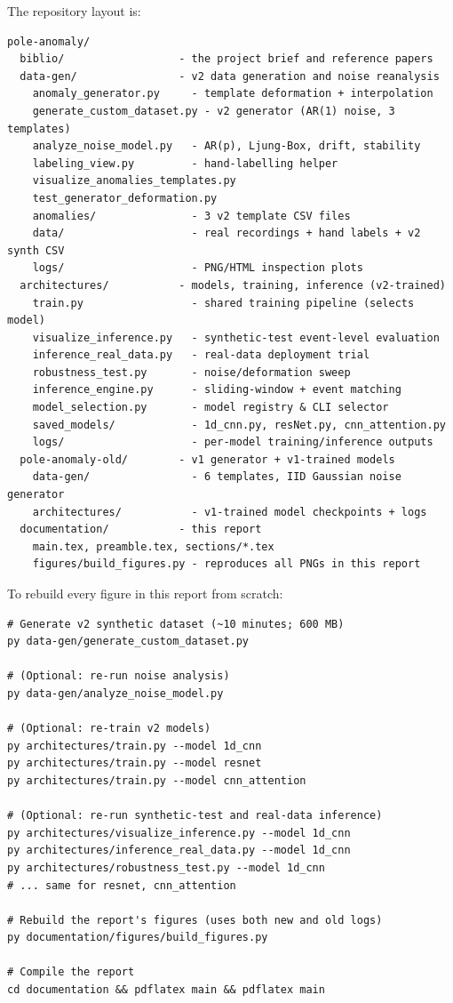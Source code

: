 The repository layout is:
\begin{lstlisting}[basicstyle=\ttfamily\footnotesize, caption={Top-level project structure.}]
pole-anomaly/
  biblio/                  - the project brief and reference papers
  data-gen/                - v2 data generation and noise reanalysis
    anomaly_generator.py     - template deformation + interpolation
    generate_custom_dataset.py - v2 generator (AR(1) noise, 3 templates)
    analyze_noise_model.py   - AR(p), Ljung-Box, drift, stability
    labeling_view.py         - hand-labelling helper
    visualize_anomalies_templates.py
    test_generator_deformation.py
    anomalies/               - 3 v2 template CSV files
    data/                    - real recordings + hand labels + v2 synth CSV
    logs/                    - PNG/HTML inspection plots
  architectures/           - models, training, inference (v2-trained)
    train.py                 - shared training pipeline (selects model)
    visualize_inference.py   - synthetic-test event-level evaluation
    inference_real_data.py   - real-data deployment trial
    robustness_test.py       - noise/deformation sweep
    inference_engine.py      - sliding-window + event matching
    model_selection.py       - model registry & CLI selector
    saved_models/            - 1d_cnn.py, resNet.py, cnn_attention.py
    logs/                    - per-model training/inference outputs
  pole-anomaly-old/        - v1 generator + v1-trained models
    data-gen/                - 6 templates, IID Gaussian noise generator
    architectures/           - v1-trained model checkpoints + logs
  documentation/           - this report
    main.tex, preamble.tex, sections/*.tex
    figures/build_figures.py - reproduces all PNGs in this report
\end{lstlisting}

To rebuild every figure in this report from scratch:

\begin{lstlisting}[basicstyle=\ttfamily\footnotesize]
# Generate v2 synthetic dataset (~10 minutes; 600 MB)
py data-gen/generate_custom_dataset.py

# (Optional: re-run noise analysis)
py data-gen/analyze_noise_model.py

# (Optional: re-train v2 models)
py architectures/train.py --model 1d_cnn
py architectures/train.py --model resnet
py architectures/train.py --model cnn_attention

# (Optional: re-run synthetic-test and real-data inference)
py architectures/visualize_inference.py --model 1d_cnn
py architectures/inference_real_data.py --model 1d_cnn
py architectures/robustness_test.py --model 1d_cnn
# ... same for resnet, cnn_attention

# Rebuild the report's figures (uses both new and old logs)
py documentation/figures/build_figures.py

# Compile the report
cd documentation && pdflatex main && pdflatex main
\end{lstlisting}

